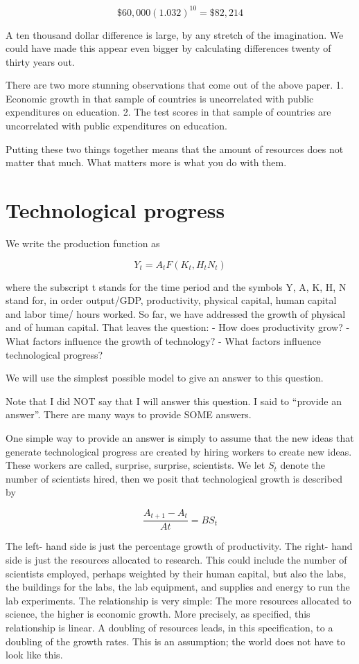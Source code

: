 \documentclass[
]{book}
\begin{document}
\[\$60,000 (1.032)^{10} = \$82,214\]

A ten thousand dollar difference is large, by any stretch of the imagination. We could have made this appear even bigger by calculating differences twenty of thirty years out.

There are two more stunning observations that come out of the above paper.
1. Economic growth in that sample of countries is uncorrelated with public expenditures on education.
2. The test scores in that sample of countries are uncorrelated with public expenditures on education.

Putting these two things together means that the amount of resources does not matter that much. What matters more is what you do with them.

\hypertarget{technological-progress}{%
\section{Technological progress}\label{technological-progress}}

We write the production function as

\[Y_t  =  A_t F( K_t, H_tN_t)\]

where the subscript t stands for the time period and the symbols Y, A, K, H, N stand for, in order output/GDP, productivity, physical capital, human capital and labor time/ hours worked. So far, we have addressed the growth of physical and of human capital. That leaves the question:
- How does productivity grow?
- What factors influence the growth of technology?
- What factors influence technological progress?

We will use the simplest possible model to give an answer to this question.

Note that I did NOT say that I will answer this question. I said to ``provide an answer''. There are many ways to provide SOME answers.

One simple way to provide an answer is simply to assume that the new ideas that generate technological progress are created by hiring workers to create new ideas. These workers are called, surprise, surprise, scientists. We let \(S_t\) denote the number of scientists hired, then we posit that technological growth is described by

\[ \frac{A_{t+1} - A_t}{At}  =  B S_t\]

The left- hand side is just the percentage growth of productivity. The right- hand side is just the resources allocated to research. This could include the number of scientists employed, perhaps weighted by their human capital, but also the labs, the buildings for the labs, the lab equipment, and supplies and energy to run the lab experiments. The relationship is very simple: The more resources allocated to science, the higher is economic growth. More precisely, as specified, this relationship is linear. A doubling of resources leads, in this specification, to a doubling of the growth rates. This is an assumption; the world does not have to look like this.
\end{document}
